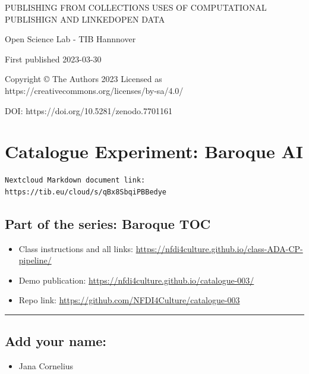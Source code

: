 \documentclass[
  letterpaper,
]{book}
\providecommand{\tightlist}{%
  \setlength{\itemsep}{0pt}\setlength{\parskip}{0pt}}\usepackage{longtable,booktabs,array}
\begin{document}
PUBLISHING FROM COLLECTIONS USES OF COMPUTATIONAL PUBLISHIGN AND
LINKEDOPEN DATA

Open Science Lab - TIB Hannnover

First published 2023-03-30

Copyright © The Authors 2023 Licensed as
https://creativecommons.org/licenses/by-sa/4.0/

DOI: https://doi.org/10.5281/zenodo.7701161


\hypertarget{catalogue-experiment-baroque-ai}{%
\chapter{Catalogue Experiment: Baroque
AI}\label{catalogue-experiment-baroque-ai}}

\begin{verbatim}
Nextcloud Markdown document link: https://tib.eu/cloud/s/qBx8SbqiPBBedye 
\end{verbatim}

\hypertarget{part-of-the-series-baroque-toc-1}{%
\section{Part of the series: Baroque
TOC}\label{part-of-the-series-baroque-toc-1}}

\begin{itemize}
\tightlist
\item
  Class instructions and all links:
  \url{https://nfdi4culture.github.io/class-ADA-CP-pipeline/}
\item
  Demo publication: \url{https://nfdi4culture.github.io/catalogue-003/}
\item
  Repo link: \url{https://github.com/NFDI4Culture/catalogue-003}
\end{itemize}

\begin{center}\rule{0.5\linewidth}{0.5pt}\end{center}

\hypertarget{add-your-name}{%
\section{Add your name:}\label{add-your-name}}

\begin{itemize}
\tightlist
\item
  Jana Cornelius
\end{itemize}
\end{document}
